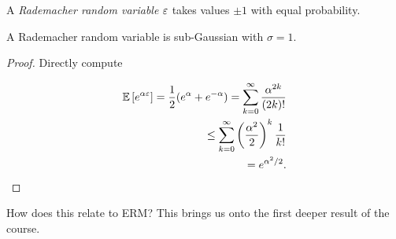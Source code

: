 \documentclass[11pt]{scrartcl}
\begin{document}
\begin{definition}
A \emph{Rademacher random variable} $\varepsilon$ takes values $\pm 1$ with equal probability.
\end{definition}

\begin{theorem}
A Rademacher random variable is sub-Gaussian with $\sigma=1$.

\begin{proof}
Directly compute

\begin{align*}
    \mathbb{E} \left[ e^{\alpha \varepsilon} \right] = \frac12(e^\alpha + e^{-\alpha}) = \sum_{k=0}^{\infty} \frac{\alpha^{2k}}{(2k)!} \\
    \le \sum_{k=0}^{\infty} \left(\frac{\alpha^2}{2} \right)^k \frac{1}{k!} \\
    = e^{\alpha^2 / 2}.
\end{align*}
\end{proof}
\end{theorem}


How does this relate to ERM? This brings us onto the first deeper result of the course.
\end{document}
